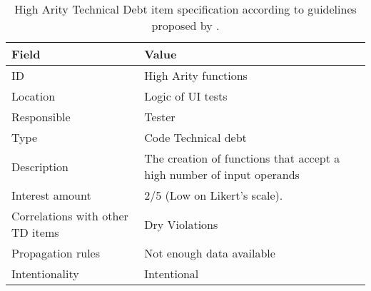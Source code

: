     \begin{table}[!htbp]
		\centering
		\tabulinesep=1.2mm
		\begin{tabu} to \textwidth {|X|X[3]|}
			
			\hline
			\textbf{Field} & \textbf{Value} \\ 
			\hline
			
			ID & High Arity functions\\
			\hline
			
			Location & Logic of UI tests \\
			\hline
			
			Responsible & Tester \\
			\hline
			
			Type & Code Technical debt \\
			\hline	
			
			Description & The creation of functions that accept a high number of input operands \\
			\hline
			
			
			
			Interest amount &  2/5 (Low on Likert's scale). \\
			\hline
			
			
			
			Correlations with other TD items & Dry Violations\\
			\hline 	 
			
			
			
			Propagation rules & Not enough data available\\
			\hline
			
			Intentionality & Intentional \\
			\hline 	 	
			
		\end{tabu}
		\label{tab:res-high-arity}
		\caption[High Arity TD item specification]{High Arity Technical Debt item specification according to guidelines proposed by \cite{mapping_study_td}.}
	\end{table}





